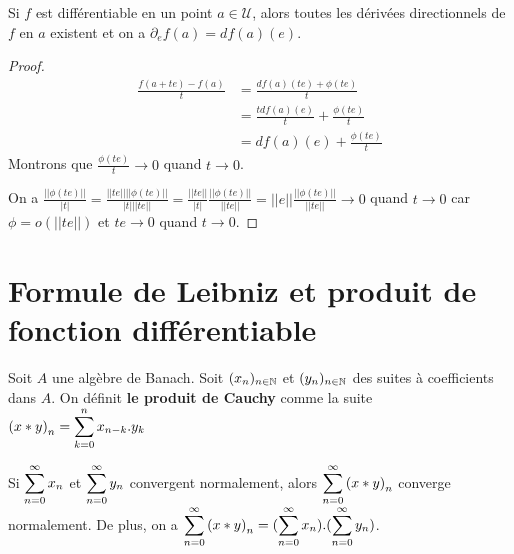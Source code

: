 \begin{proposition}
	Si $f$ est différentiable en un point $a \in \mathcal{U}$, alors toutes les
	dérivées directionnels de $f$ en $a$ existent et on a $\partial_{e}f(a) =
	df(a)(e)$.
\end{proposition}

\ifdefined\outputproof
\begin{proof}
\begin{align}
	\displaystyle \frac{f(a + te) - f(a)}{t}
	&= \frac{df(a)(te) + \phi(te)}{t}\\
	&= \frac{t df(a)(e)}{t} + \frac{\phi(te)}{t} \\
	&= df(a)(e) + \frac{\phi(te)}{t}
\end{align}
	Montrons que $\displaystyle \frac{\phi(te)}{t} \rightarrow 0$ quand $t
	\rightarrow 0$.

	On a $\displaystyle \frac{||\phi(te)||}{|t|} = \frac{||te||
	||\phi(te)||}{|t| ||te||} = \frac{||te||}{|t|}
	\frac{||\phi(te)||}{||te||} = ||e|| \frac{||\phi(te)||}{||te||} \rightarrow
	0$ quand $t \rightarrow 0$ car $\phi = o(||te||)$ et $te \rightarrow 0$
	quand $t \rightarrow 0$.
\end{proof}
\fi

\begin{definition}
\label{partial_application_definition}


\end{definition}

\section{Formule de Leibniz et produit de fonction différentiable}

\begin{definition}
	Soit $A$ une algèbre de Banach. Soit $(x_{n})_{n \in \mathbb{N}}$ et
	$(y_{n})_{n \in \mathbb{N}}$ des suites à coefficients dans $A$.
	On définit \textbf{le produit de Cauchy} comme la suite ${(x \ast y)}_{n} =
	\displaystyle \sum_{k = 0}^{n} x_{n - k} . y_{k}$
\end{definition}

\begin{theorem}
\label{theorem_cauchy_mertens}
Si $\displaystyle \sum_{n = 0}^{\infty} x_{n}$ et $\displaystyle \sum_{n = 0}^{\infty} y_{n}$ convergent
normalement, alors $\displaystyle \sum_{n = 0}^{\infty} {(x \ast y)}_{n}$ converge normalement.
De plus, on a $\displaystyle \sum_{n = 0}^{\infty} {(x \ast y)}_{n} =
(\displaystyle \sum_{n = 0}^{\infty} x_{n}) . (\displaystyle \sum_{n = 0}^{\infty} y_{n})$.
\end{theorem}

